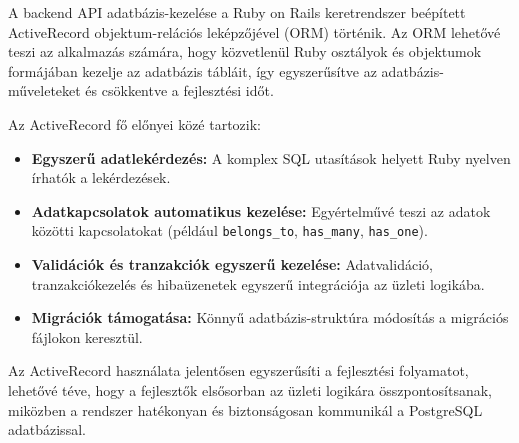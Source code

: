   A backend API adatbázis-kezelése a Ruby on Rails keretrendszer beépített ActiveRecord objektum-relációs leképzőjével (ORM) történik. Az ORM lehetővé teszi az alkalmazás számára, hogy közvetlenül Ruby osztályok és objektumok formájában kezelje az adatbázis tábláit, így egyszerűsítve az adatbázis-műveleteket és csökkentve a fejlesztési időt.
  
  Az ActiveRecord fő előnyei közé tartozik:
  \begin{itemize}
      \item \textbf{Egyszerű adatlekérdezés:} A komplex SQL utasítások helyett Ruby nyelven írhatók a lekérdezések.
      \item \textbf{Adatkapcsolatok automatikus kezelése:} Egyértelművé teszi az adatok közötti kapcsolatokat (például \texttt{belongs\_to}, \texttt{has\_many}, \texttt{has\_one}).
      \item \textbf{Validációk és tranzakciók egyszerű kezelése:} Adatvalidáció, tranzakciókezelés és hibaüzenetek egyszerű integrációja az üzleti logikába.
      \item \textbf{Migrációk támogatása:} Könnyű adatbázis-struktúra módosítás a migrációs fájlokon keresztül.
  \end{itemize}
  
  Az ActiveRecord használata jelentősen egyszerűsíti a fejlesztési folyamatot, lehetővé téve, hogy a fejlesztők elsősorban az üzleti logikára összpontosítsanak, miközben a rendszer hatékonyan és biztonságosan kommunikál a PostgreSQL adatbázissal.
  